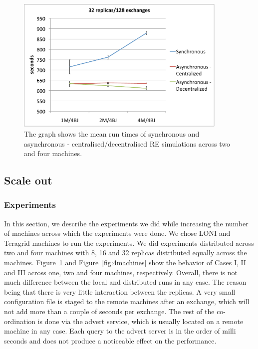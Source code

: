 \documentclass{rspublic}
\begin{document}
\begin{figure}
\centering
\includegraphics[width=0.9\textwidth]{../data/32rep.pdf}
\caption{\small The graph shows the mean run times of synchronous and
  asynchronous - centralised/decentralised RE simulations across two
  and four machines. }
\label{fig:2machines}
\vspace{-1em}
\end{figure}

\subsection{Scale out}

\subsubsection{Experiments}
In this section, we describe the experiments we did while increasing
the number of machines across which the experiments were done. We
chose LONI and Teragrid machines to run the experiments. We did
experiments distributed across two and four machines with 8, 16 and 32
replicas distributed equally across the machines.
Figure~\ref{fig:2machines} and Figure~\ref{fig:4machines} show the
behavior of Cases I, II and III across one, two and four machines,
respectively. Overall, there is not much difference between the local
and distributed runs in any case. The reason being that there is very
little interaction between the replicas. A very small configuration
file is staged to the remote machines after an exchange, which will
not add more than a couple of seconds per exchange. The rest of the
co-ordination is done via the advert service, which is usually located
on a remote machine in any case. Each query to the advert server is in
the order of milli seconds and does not produce a noticeable effect on
the performance.
\end{document}
